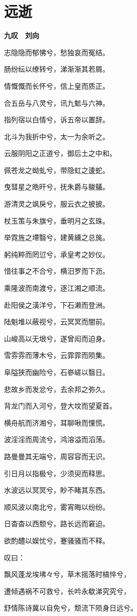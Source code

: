 \documentclass[12pt,a4paper]{ctexbook}
\begin{document}
\section{远逝}
\textbf{九叹　刘向}\par\vspace{0.5em}
志隐隐而郁怫兮，愁独哀而冤结。\par
肠纷纭以缭转兮，涕渐渐其若屑。\par
情慨慨而长怀兮，信上皇而质正。\par
合五岳与八灵兮，讯九鬿与六神。\par
指列宿以白情兮，诉五帝以置辞。\par
北斗为我折中兮，太一为余听之。\par
云服阴阳之正道兮，御后土之中和。\par
佩苍龙之蚴虬兮，带隐虹之逶蛇。\par
曳彗星之皓旰兮，抚朱爵与鵔鸃。\par
游清灵之飒戾兮，服云衣之披披。\par
杖玉策与朱旗兮，垂明月之玄珠。\par
举霓旌之墆翳兮，建黄纁之总旄。\par
躬纯粹而罔愆兮，承皇考之妙仪。\par
惜往事之不合兮，横汨罗而下沥。\par
乘隆波而南渡兮，逐江湘之顺流。\par
赴阳侯之潢洋兮，下石濑而登洲。\par
陆魁堆以蔽视兮，云冥冥而闇前。\par
山峻高以无垠兮，遂曾闳而迫身。\par
雪雰雰而薄木兮，云霏霏而陨集。\par
阜隘狭而幽险兮，石嵾嵯以翳日。\par
悲故乡而发忿兮，去余邦之弥久。\par
背龙门而入河兮，登大坟而望夏首。\par
横舟航而济湘兮，耳聊啾而戃慌。\par
波淫淫而周流兮，鸿溶溢而滔荡。\par
路曼曼其无端兮，周容容而无识。\par
引日月以指极兮，少须臾而释思。\par
水波远以冥冥兮，眇不睹其东西。\par
顺风波以南北兮，雾宵晦以纷纷。\par
日杳杳以西颓兮，路长远而窘迫。\par
欲酌醴以娱忧兮，蹇骚骚而不释。\par
叹曰：\par
飘风蓬龙埃坲々兮，草木摇落时槁悴兮，\par
遭倾遇祸不可救兮，长吟永欷涕究究兮，\par
舒情陈诗冀以自免兮，颓流下陨身日远兮。\par
\end{document}
